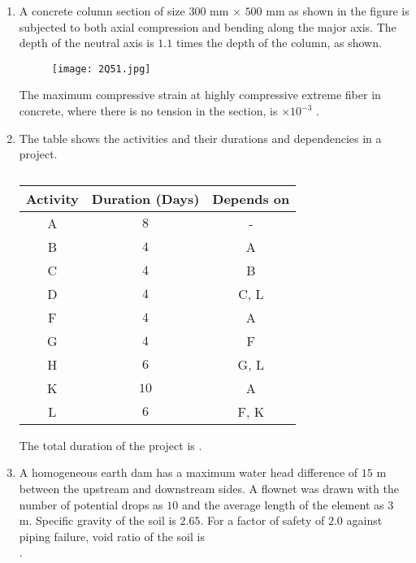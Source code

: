 \documentclass[journal,12pt,onecolumn]{article}
\theoremstyle{remark}
\begin{document}
\begin{enumerate}
    \hfill{}

    \item A concrete column section of size $300$ mm $\times$ $500$ mm as shown in the figure  is
    subjected to both axial compression and bending along the major axis. The depth of
    the neutral axis  is $1.1$ times the depth of the column, as shown.
    \begin{figure}[H]
        \centering
        \texttt{[image: 2Q51.jpg]}
        \caption{}
        \label{fig:q51}
    \end{figure}
    
    The maximum compressive strain  at highly compressive extreme fiber in
    concrete, where there is no tension in the section, is \underline{\hspace{2cm}} $\times 10^{-3}$
    .
    
    \hfill{}

    \item The table shows the activities and their durations and dependencies in a project.
    \begin{table}[H]
        \centering
        \begin{tabular}{|c|c|c|}
        \hline
        \textbf{Activity} & \textbf{Duration (Days)} & \textbf{Depends on} \\ \hline
        A & $8$ & - \\
        B & $4$ & A \\
        C & $4$ & B \\
        D & $4$ & C, L \\
        F & $4$ & A \\
        G & $4$ & F \\
        H & $6$ & G, L \\
        K & $10$ & A \\
        L & $6$ & F, K \\ \hline
        \end{tabular}
        \caption{}
        \label{tab:q52}
    \end{table}
    The total duration  of the project is \underline{\hspace{2cm}} .
    
    \hfill{}

    \item A homogeneous earth dam has a maximum water head difference of $15$ m between
    the upstream and downstream sides. A flownet was drawn with the number of
    potential drops as $10$ and the average length of the element as $3$ m. Specific gravity
    of the soil is $2.65$. For a factor of safety of $2.0$ against piping failure, void ratio of
    the soil is \underline{\hspace{2cm}} \\
    .
    

\end{enumerate}
\end{document}
